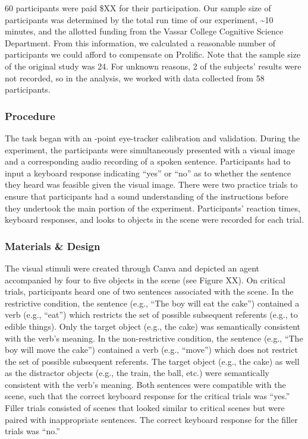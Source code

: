\documentclass[
  english,
  man,floatsintext]{apa6}
\begin{document}
60 participants were paid \$XX for their participation. Our sample size of participants was determined by the total run time of our experiment, \textasciitilde10 minutes, and the allotted funding from the Vassar College Cognitive Science Department. From this information, we calculated a reasonable number of participants we could afford to compensate on Prolific. Note that the sample size of the original study was 24. For unknown reasons, 2 of the subjects' results were not recorded, so in the analysis, we worked with data collected from 58 participants.

\hypertarget{procedure}{%
\subsubsection{Procedure}\label{procedure}}

The task began with an -point eye-tracker calibration and validation. During the experiment, the participants were simultaneously presented with a visual image and a corresponding audio recording of a spoken sentence. Participants had to input a keyboard response indicating ``yes'' or ``no'' as to whether the sentence they heard was feasible given the visual image. There were two practice trials to ensure that participants had a sound understanding of the instructions before they undertook the main portion of the experiment. Participants' reaction times, keyboard responses, and looks to objects in the scene were recorded for each trial.

\hypertarget{materials-design}{%
\subsubsection{Materials \& Design}\label{materials-design}}

The visual stimuli were created through Canva and depicted an agent accompanied by four to five objects in the scene (see Figure XX). On critical trials, participants heard one of two sentences associated with the scene. In the restrictive condition, the sentence (e.g., ``The boy will eat the cake'') contained a verb (e.g., ``eat'') which restricts the set of possible subsequent referents (e.g., to edible things). Only the target object (e.g., the cake) was semantically consistent with the verb's meaning. In the non-restrictive condition, the sentence (e.g., ``The boy will move the cake'') contained a verb (e.g., ``move'') which does not restrict the set of possible subsequent referents. The target object (e.g., the cake) as well as the distractor objects (e.g., the train, the ball, etc.) were semantically consistent with the verb's meaning. Both sentences were compatible with the scene, such that the correct keyboard response for the critical trials was ``yes.'' Filler trials consisted of scenes that looked similar to critical scenes but were paired with inappropriate sentences. The correct keyboard response for the filler trials was ``no.''
\end{document}
